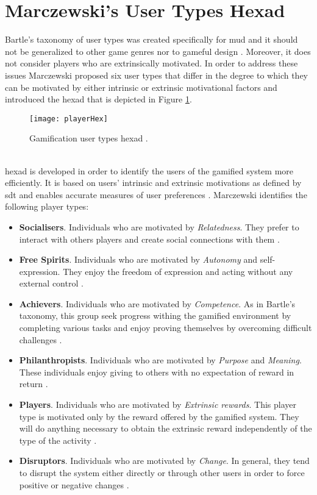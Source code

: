 \section{Marczewski's User Types Hexad}
Bartle's taxonomy of user types was created
specifically for \acrshort{mud} and it should not be generalized to other game genres nor to gameful design \cite{tondello2016gamification}. Moreover, it does not consider players who are extrinsically motivated. In order to address these issues Marczewski proposed six user types that differ in the degree to which they can be motivated by either intrinsic or extrinsic motivational factors \cite{tondello2016gamification} and introduced the \acrlong{hexad} that is depicted in Figure \ref{fig:playerHex}.
\begin{figure}[h]
    \centering
    \texttt{[image: playerHex]}
    \caption{Gamification user types hexad \cite{tondello2016gamification}.}
    \label{fig:playerHex}
\end{figure}\\
\acrshort{hexad} is developed in order to identify the users of the gamified system more efficiently. It is based on users' intrinsic and extrinsic motivations as defined by \acrshort{sdt} and enables accurate measures of user preferences \cite{tondello2016gamification}. Marczewski identifies the following player types:
\begin{itemize}
\item \textbf{Socialisers}. Individuals who are motivated by \textit{Relatedness}. They prefer to interact with others players and create social connections with them \cite{tondello2016gamification}.
\item \textbf{Free Spirits}. Individuals who are  motivated by \textit{Autonomy} and self-expression. They enjoy the freedom of expression and acting without any external control \cite{tondello2016gamification}.   
\item \textbf{Achievers}. Individuals who are  motivated by \textit{Competence}. As in Bartle's taxonomy, this group seek progress withing the gamified environment by completing various tasks and enjoy proving themselves by overcoming difficult challenges \cite{tondello2016gamification}.
\item \textbf{Philanthropists}. Individuals who are motivated by \textit{Purpose} and \textit{Meaning}. These individuals enjoy giving to others with no expectation of reward in return \cite{tondello2016gamification}.
\item \textbf{Players}. Individuals who are motivated by \textit{Extrinsic rewards}. This player type is motivated only by the reward offered by the gamified system. They will do anything necessary to obtain the extrinsic reward independently of the type of the activity \cite{tondello2016gamification}.
\item \textbf{Disruptors}. Individuals who are  motivated by \textit{Change}. In general, they tend to disrupt the system either directly or through other users in order to force positive or negative changes \cite{tondello2016gamification}.
\end{itemize}
